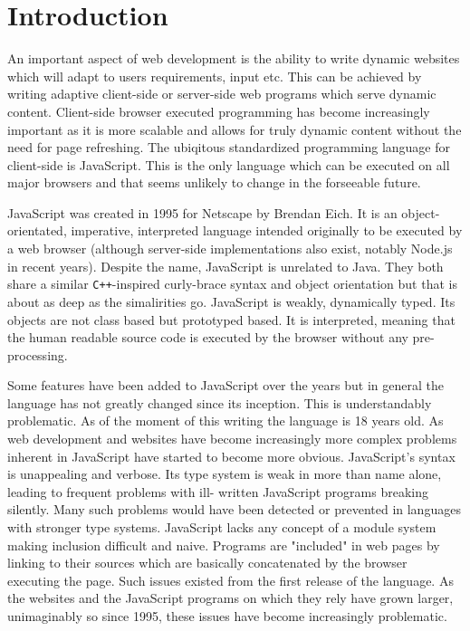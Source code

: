 \section{Introduction}
An important aspect of web development is the ability to write dynamic
websites which will adapt to users requirements, input etc. This can be
achieved by writing adaptive client-side or server-side web programs
which serve dynamic content. Client-side browser executed programming 
has become  increasingly important as it is more scalable and allows 
for truly dynamic content without the need for page refreshing. The 
ubiqitous standardized programming language for client-side is JavaScript.
This is the only language which can be executed on all major browsers and 
that seems unlikely to change in the forseeable future. 

JavaScript was created in 1995 for Netscape by Brendan Eich. It is an
object-orientated, imperative, interpreted language intended originally
to be executed by a web browser (although server-side implementations
also exist, notably Node.js in recent years). Despite the name, JavaScript
is unrelated to Java. They both share a similar \verb!C++!-inspired
curly-brace syntax and object orientation but that is about as deep as
the simalirities go. JavaScript is weakly, dynamically typed. Its objects
are not class based but prototyped based. It is interpreted, meaning
that the human readable source code is executed by the browser without
any pre-processing. 

Some features have been added to JavaScript over the years but in 
general the language has not greatly changed since its inception. This
is understandably problematic. As of the moment of this writing the
language is 18 years old. 
As web development and websites have become increasingly more complex
problems inherent in JavaScript have started to become more obvious.
JavaScript's syntax is unappealing and verbose. Its type system is 
weak in more than name alone, leading to frequent problems with ill-
written JavaScript programs breaking silently. Many such problems 
would have been detected or prevented in languages with stronger
type systems. JavaScript lacks any concept of a module system making
inclusion difficult and naive. Programs are "included" in web pages
by linking to their sources which are basically concatenated by the
browser executing the page. Such issues existed from the first 
release of the language. As the websites and the JavaScript
programs on which they rely have grown larger, unimaginably so since
1995, these issues have become increasingly problematic.

